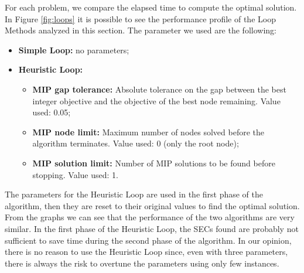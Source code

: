 \noindent
For each problem, we compare the elapsed time to compute the optimal solution.\\
In Figure \ref{fig:loops} it is possible to see the performance profile of the Loop Methods analyzed in this section.
The parameter we used are the following:
\begin{itemize}
 	\item \textbf{Simple Loop:} no parameters;
	\item \textbf{Heuristic Loop:} 
	\begin{itemize} 
		\item \textbf{MIP gap tolerance:} Absolute tolerance on the gap between the best integer objective and the objective of the best node remaining. Value used: 0.05;
		\item \textbf{MIP node limit:} Maximum number of nodes solved before the algorithm terminates. Value used: 0 (only the root node);
		\item \textbf{MIP solution limit:} Number of MIP solutions to be found before stopping. Value used: 1.
		\end{itemize}
\end{itemize}
The parameters for the Heuristic Loop are used in the first phase of the algorithm, then they are reset to their original values to find the optimal solution.
From the graphs we can see that the performance of the two algorithms are very similar. In the first phase of the Heuristic Loop, the SECs found are probably not sufficient to save time during the second phase of the algorithm. In our opinion, there is no reason to use the Heuristic Loop since, even with three parameters, there is always the risk to overtune the parameters using only few instances.


